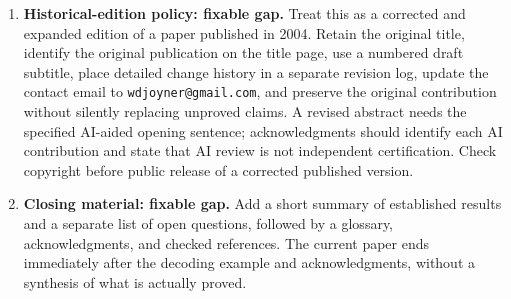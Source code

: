 \documentclass[12pt,letterpaper]{article}
\begin{document}
\begin{enumerate}[label=\textbf{S\arabic*.},leftmargin=*]
\item \textbf{Historical-edition policy: fixable gap.}  Treat this as a corrected and expanded edition of a paper published in 2004.  Retain the original title, identify the original publication on the title page, use a numbered draft subtitle, place detailed change history in a separate revision log, update the contact email to \texttt{wdjoyner@gmail.com}, and preserve the original contribution without silently replacing unproved claims.  A revised abstract needs the specified AI-aided opening sentence; acknowledgments should identify each AI contribution and state that AI review is not independent certification.  Check copyright before public release of a corrected published version.
\item \textbf{Closing material: fixable gap.}  Add a short summary of established results and a separate list of open questions, followed by a glossary, acknowledgments, and checked references.  The current paper ends immediately after the decoding example and acknowledgments, without a synthesis of what is actually proved.
\end{enumerate}
\end{document}
